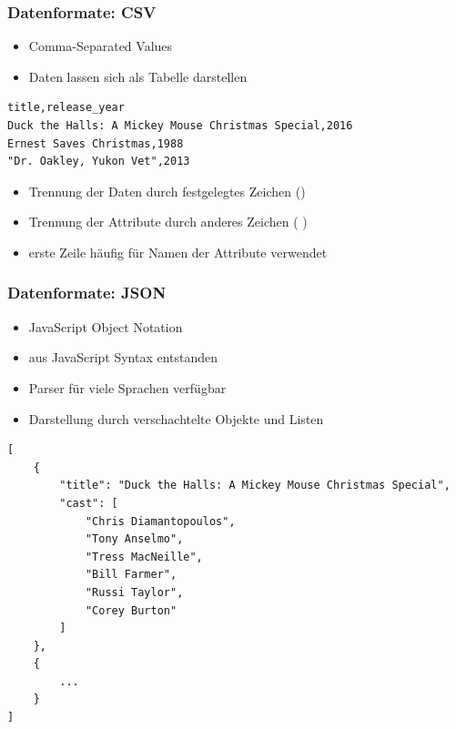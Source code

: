 
\begin{frame}[fragile]
\frametitle{Datenformate: CSV}

\begin{itemize}
\item \alert{C}omma-\alert{S}eparated \alert{V}alues
\item Daten lassen sich als Tabelle darstellen
\end{itemize}

\begin{lstlisting}
title,release_year
Duck the Halls: A Mickey Mouse Christmas Special,2016
Ernest Saves Christmas,1988
"Dr. Oakley, Yukon Vet",2013
\end{lstlisting}

\begin{itemize}
\item Trennung der Daten durch festgelegtes Zeichen ()
\item Trennung der Attribute durch anderes Zeichen (\code{,} \code{;} )
\item erste Zeile häufig für Namen der Attribute verwendet
\end{itemize}

\end{frame}


\begin{frame}[fragile]
\frametitle{Datenformate: JSON}

\begin{itemize}
\item \alert{J}ava\alert{S}cript \alert{O}bject \alert{N}otation
\item aus JavaScript Syntax entstanden
\item Parser für viele Sprachen verfügbar
\item Darstellung durch verschachtelte Objekte und Listen
\end{itemize}

\begin{lstlisting}[basicstyle=\tiny\ttfamily]
[
    {
        "title": "Duck the Halls: A Mickey Mouse Christmas Special",
        "cast": [
            "Chris Diamantopoulos",
            "Tony Anselmo",
            "Tress MacNeille",
            "Bill Farmer",
            "Russi Taylor",
            "Corey Burton"
        ]
    },
    {
        ...
    }
]
\end{lstlisting}

\end{frame}

